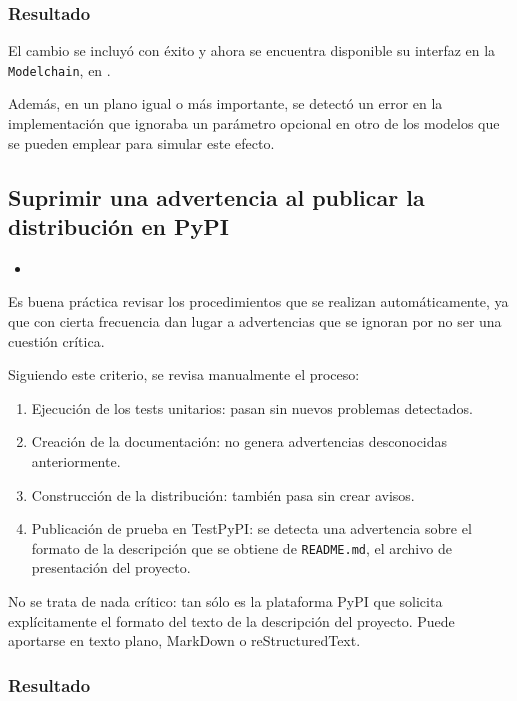 \subsubsection{Resultado}

El cambio se incluyó con éxito y ahora se encuentra disponible su interfaz en la \texttt{Modelchain}, en .

Además, en un plano igual o más importante, se detectó un error en la implementación que ignoraba un parámetro opcional en otro de los modelos que se pueden emplear para simular este efecto.

\subsection{Suprimir una advertencia al publicar la distribución en PyPI}

\begin{itemize}
    \item {}
\end{itemize}

Es buena práctica revisar los procedimientos que se realizan automáticamente, ya que con cierta frecuencia dan lugar a advertencias que se ignoran por no ser una cuestión crítica.

Siguiendo este criterio, se revisa manualmente el proceso:

\begin{enumerate}
    \item Ejecución de los tests unitarios: pasan sin nuevos problemas detectados.
    \item Creación de la documentación: no genera advertencias desconocidas anteriormente.
    \item Construcción de la distribución: también pasa sin crear avisos.
    \item Publicación de prueba en TestPyPI: se detecta una advertencia sobre el formato de la descripción que se obtiene de \texttt{README.md}, el archivo de presentación del proyecto.
\end{enumerate}

No se trata de nada crítico: tan sólo es la plataforma PyPI que solicita explícitamente el formato del texto de la descripción del proyecto. Puede aportarse en texto plano, MarkDown o reStructuredText.  %

\subsubsection{Resultado}

